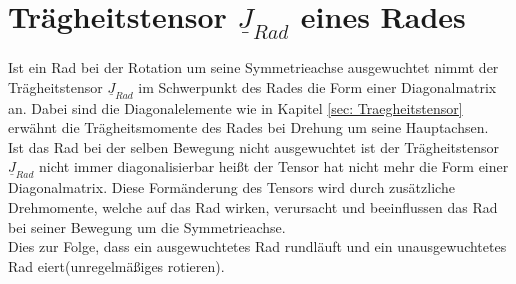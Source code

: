 

\section{Trägheitstensor $\underline{J}_{Rad}$ eines Rades}
\label{sec: Rad}

Ist ein Rad bei der Rotation um seine Symmetrieachse ausgewuchtet nimmt der Trägheitstensor $\underline{J}_{Rad}$ im Schwerpunkt des Rades 
die Form einer Diagonalmatrix an. Dabei sind die Diagonalelemente wie in Kapitel \ref{sec: Traegheitstensor} erwähnt die Trägheitsmomente des Rades bei Drehung um
seine Hauptachsen. \\
Ist das Rad bei der selben Bewegung nicht ausgewuchtet ist der Trägheitstensor $\underline{J}_{Rad}$ nicht immer diagonalisierbar
heißt der Tensor hat nicht mehr die Form einer Diagonalmatrix. Diese Formänderung des Tensors wird durch zusätzliche Drehmomente, welche auf das Rad wirken, 
verursacht und beeinflussen das Rad bei seiner Bewegung um die Symmetrieachse. \\
Dies zur Folge, dass ein ausgewuchtetes Rad \dq rund\dq läuft und ein 
unausgewuchtetes Rad \dq eiert\dq (unregelmäßiges rotieren).